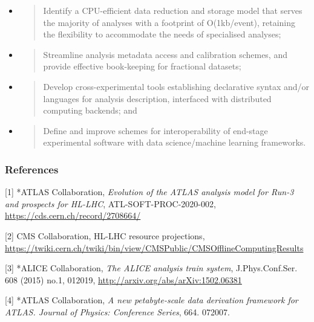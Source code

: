 \documentclass[11pt,a4paper]{article}
\begin{document}
\begin{itemize}
\item
  \begin{quote}
  Identify a CPU-efficient data reduction and storage model that serves
  the majority of analyses with a footprint of O(1kb/event), retaining
  the flexibility to accommodate the needs of specialised analyses;
  \end{quote}
\item
  \begin{quote}
  Streamline analysis metadata access and calibration schemes, and
  provide effective book-keeping for fractional datasets;
  \end{quote}
\item
  \begin{quote}
  Develop cross-experimental tools establishing declarative syntax
  and/or languages for analysis description, interfaced with distributed
  computing backends; and
  \end{quote}
\item
  \begin{quote}
  Define and improve schemes for interoperability of end-stage
  experimental software with data science/machine learning frameworks.
  \end{quote}
\end{itemize}

\hypertarget{references-2}{%
\subsubsection{References}\label{references-2}}

{[}1{]} *ATLAS Collaboration, \emph{Evolution of the ATLAS analysis
model for Run-3 and prospects for HL-LHC}, ATL-SOFT-PROC-2020-002,
\href{https://cds.cern.ch/record/2708664/}{{https://cds.cern.ch/record/2708664/}}

{[}2{]} CMS Collaboration, HL-LHC resource projections,
\href{https://twiki.cern.ch/twiki/bin/view/CMSPublic/CMSOfflineComputingResults}{{https://twiki.cern.ch/twiki/bin/view/CMSPublic/CMSOfflineComputingResults}}

{[}3{]} *ALICE Collaboration, \emph{The ALICE analysis train system},
J.Phys.Conf.Ser. 608 (2015) no.1, 012019,
\href{http://arxiv.org/abs/arXiv:1502.06381}{{http://arxiv.org/abs/arXiv:1502.06381}}

{[}4{]} *ATLAS Collaboration, \emph{A new petabyte-scale data derivation
framework for ATLAS. Journal of Physics: Conference Series}, 664.
072007.
\end{document}
